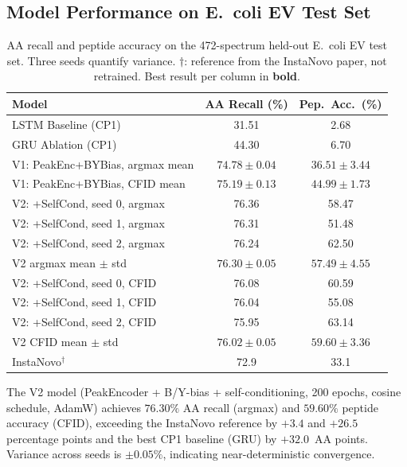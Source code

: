 \documentclass[11pt]{article}
\begin{document}
\subsection{Model Performance on E.~coli EV Test Set}

\begin{table}[H]
\centering
\caption{AA recall and peptide accuracy on the 472-spectrum held-out E.~coli EV test set.
  Three seeds quantify variance. $\dagger$: reference from the InstaNovo paper, not
  retrained. Best result per column in \textbf{bold}.}
\label{tab:results}
\begin{tabular}{lcc}
\toprule
\textbf{Model} & \textbf{AA Recall (\%)} & \textbf{Pep.\ Acc.\ (\%)} \\
\midrule
LSTM Baseline (CP1)   & 31.51 &  2.68 \\
GRU Ablation (CP1)    & 44.30 &  6.70 \\
\midrule
V1: PeakEnc+BYBias, argmax mean  & $74.78 \pm 0.04$ & $36.51 \pm 3.44$ \\
V1: PeakEnc+BYBias, CFID mean    & $75.19 \pm 0.13$ & $44.99 \pm 1.73$ \\
\midrule
V2: +SelfCond, seed 0, argmax  & 76.36 & 58.47 \\
V2: +SelfCond, seed 1, argmax  & 76.31 & 51.48 \\
V2: +SelfCond, seed 2, argmax  & 76.24 & 62.50 \\
\rowcolor{gray!15}
V2 argmax mean $\pm$ std & $\mathbf{76.30 \pm 0.05}$ & $57.49 \pm 4.55$ \\
\midrule
V2: +SelfCond, seed 0, CFID    & 76.08 & 60.59 \\
V2: +SelfCond, seed 1, CFID    & 76.04 & 55.08 \\
V2: +SelfCond, seed 2, CFID    & 75.95 & 63.14 \\
\rowcolor{gray!15}
V2 CFID mean $\pm$ std & $76.02 \pm 0.05$ & $\mathbf{59.60 \pm 3.36}$ \\
\midrule
InstaNovo$^\dagger$   & 72.9  & 33.1  \\
\bottomrule
\end{tabular}
\end{table}

The V2 model (PeakEncoder + B/Y-bias + self-conditioning, 200 epochs, cosine schedule,
AdamW) achieves $76.30\%$ AA recall (argmax) and $59.60\%$ peptide accuracy (CFID),
exceeding the InstaNovo reference by $+3.4$ and $+26.5$ percentage points and
the best CP1 baseline (GRU) by $+32.0$~AA points. Variance across seeds is
$\pm0.05\%$, indicating near-deterministic convergence.
\end{document}
